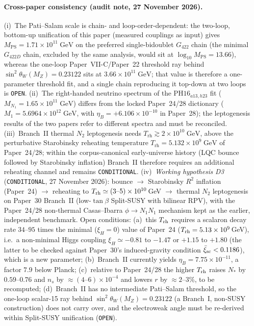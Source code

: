 \documentclass[11pt,a4paper]{article}
\begin{document}
\paragraph{Cross-paper consistency (audit note, 27 November 2026).}
(i)~The Pati--Salam scale is chain- and loop-order-dependent: the two-loop, bottom-up unification of this paper (measured couplings as input) gives $M_{\mathrm{PS}} = 1.71\times 10^{11}\;\mathrm{GeV}$ on the preferred single-bidoublet $G_{422}$ chain (the minimal $G_{422D}$ chain, excluded by the same analysis, would sit at $\log_{10}M_{\mathrm{PS}} = 13.66$), whereas the one-loop Paper~VII-C/Paper~22 threshold ray behind $\sin^2\theta_W(M_Z) = 0.23122$ sits at $3.66\times 10^{11}\;\mathrm{GeV}$; that value is therefore a one-parameter threshold fit, and a single chain reproducing it top-down at two loops is \texttt{OPEN}. (ii)~The right-handed neutrino spectrum of the $\mathrm{PH16}_{a13,h23}$ fit ($M_{N_1} = 1.65\times 10^{11}\;\mathrm{GeV}$) differs from the locked Paper~24/28 dictionary ($M_1 = 5.6964\times 10^{12}\;\mathrm{GeV}$, with $\eta_B = +6.106\times 10^{-10}$ in Paper~28); the leptogenesis results of the two papers refer to different spectra and must be reconciled. (iii)~Branch~II thermal $N_2$ leptogenesis needs $T_{\mathrm{rh}} \gtrsim 2\times 10^{10}\;\mathrm{GeV}$, above the perturbative Starobinsky reheating temperature $T_{\mathrm{rh}} = 5.132\times 10^{9}\;\mathrm{GeV}$ of Paper~24/28; within the corpus-canonical early-universe history (LQC bounce followed by Starobinsky inflation) Branch~II therefore requires an additional reheating channel and remains \texttt{CONDITIONAL}. (iv)~\emph{Working hypothesis D3} (\texttt{CONDITIONAL}, 27 November 2026): bounce $\to$ Starobinsky $R^2$ inflation (Paper~24) $\to$ reheating to $T_{\rm rh}\simeq(3\text{--}5)\times10^{10}$\,GeV $\to$ thermal $N_2$ leptogenesis on Paper~30 Branch~II (low-$\tan\beta$ Split-SUSY with bilinear RPV), with the Paper~24/28 non-thermal Casas--Ibarra $\phi\to N_1N_1$ mechanism kept as the earlier, independent benchmark. Open conditions: (a)~this $T_{\rm rh}$ requires a scalaron decay rate $34$--$95$ times the minimal ($\xi_H=0$) value of Paper~24 ($T_{\rm rh}=5.13\times10^{9}$\,GeV), i.e.\ a non-minimal Higgs coupling $\xi_H\simeq-0.81$ to $-1.47$ or $+1.15$ to $+1.80$ (the latter to be checked against Paper~30's induced-gravity condition $\bar\xi_{\rm sc}<0.1186$), which is a new parameter; (b)~Branch~II currently yields $\eta_B=7.75\times10^{-11}$, a factor $7.9$ below Planck; (c)~relative to Paper~24/28 the higher $T_{\rm rh}$ raises $N_*$ by $0.59$--$0.76$ and $n_s$ by $\approx(4\text{--}6)\times10^{-4}$ and lowers $r$ by $\approx2$--$3\%$, to be recomputed; (d)~Branch~II has no intermediate Pati--Salam threshold, so the one-loop scalar-15 ray behind $\sin^2\theta_W(M_Z)=0.23122$ (a Branch~I, non-SUSY construction) does not carry over, and the electroweak angle must be re-derived within Split-SUSY unification (\texttt{OPEN}).
\end{document}

